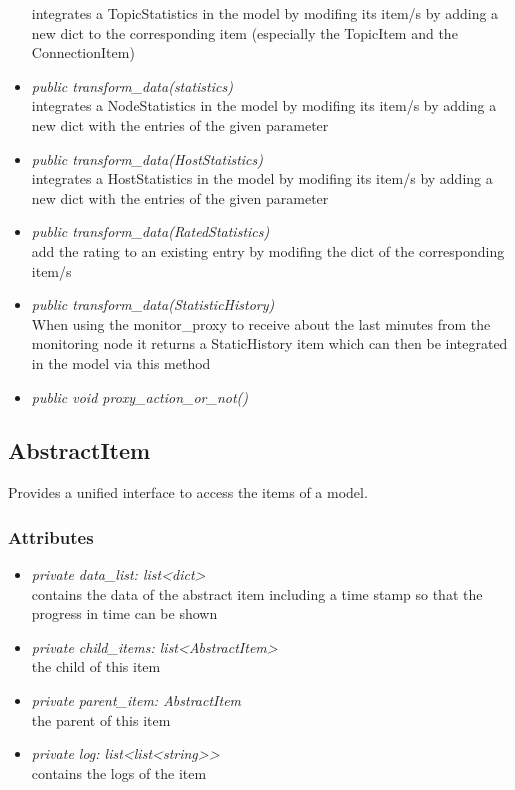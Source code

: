 \begin{itemize}
  integrates a TopicStatistics in the model by modifing its item/s by adding a new dict to the corresponding item (especially the TopicItem and the ConnectionItem)
  \item \textit{public transform\_data(statistics)}\\ 
  integrates a NodeStatistics in the model by modifing its item/s by adding a new dict with the entries of the given parameter
  \item \textit{public transform\_data(HostStatistics)}\\ 
  integrates a HostStatistics in the model by modifing its item/s by adding a new dict with the entries of the given parameter
  \item \textit{public transform\_data(RatedStatistics)}\\ 
  add the rating to an existing entry by modifing the dict of the corresponding
  item/s
  \item \textit{public transform\_data(StatisticHistory)}\\ 
  When using the monitor\_proxy to receive about the last minutes from the monitoring node
  it returns a StaticHistory item which can then be integrated in the model via this method
  \item \textit{public void proxy\_action\_or\_not()}\\
  
  \end{itemize}

\subsection{AbstractItem}
Provides a unified interface to access the items of a model.
\subsubsection{Attributes}
\begin{itemize}
  \item \textit{private data\_list: list<dict>}\\ 
  contains the data of the abstract item including a time stamp so that
  the progress in time can be shown
  \item \textit{private child\_items: list<AbstractItem>}\\ 
  the child of this item
  \item \textit{private parent\_item: AbstractItem}\\ 
  the parent of this item
  \item \textit{private log: list<list<string>>}\\
  contains the logs of the item
\end{itemize}
